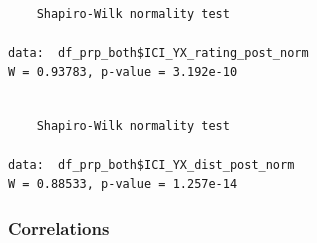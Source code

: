 \documentclass[
  letterpaper,
  DIV=11,
  numbers=noendperiod]{scrartcl}
\newenvironment{Shaded}{\begin{snugshade}}{\end{snugshade}}
\newcommand{\FunctionTok}[1]{\textcolor[rgb]{0.28,0.35,0.67}{#1}}
\newcommand{\NormalTok}[1]{\textcolor[rgb]{0.00,0.23,0.31}{#1}}
\newcommand{\SpecialCharTok}[1]{\textcolor[rgb]{0.37,0.37,0.37}{#1}}
\begin{document}
\begin{Shaded}
\end{Shaded}

\begin{verbatim}

    Shapiro-Wilk normality test

data:  df_prp_both$ICI_YX_rating_post_norm
W = 0.93783, p-value = 3.192e-10
\end{verbatim}

\begin{Shaded}
\end{Shaded}

\begin{verbatim}

    Shapiro-Wilk normality test

data:  df_prp_both$ICI_YX_dist_post_norm
W = 0.88533, p-value = 1.257e-14
\end{verbatim}

\subsubsection{Correlations}\label{correlations}
\end{document}
